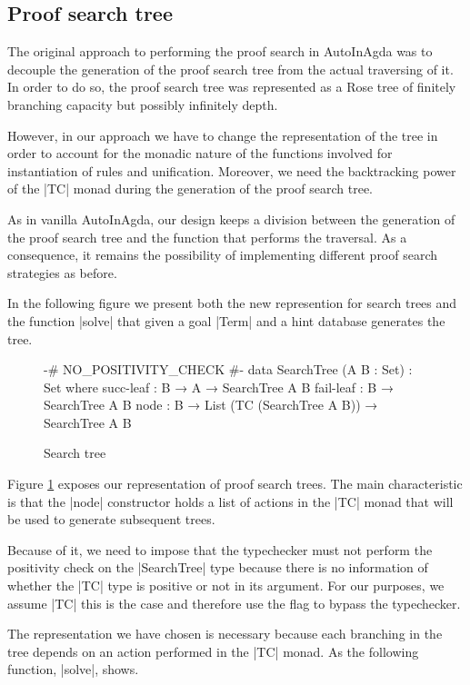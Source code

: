\documentclass[a4paper]{article}
\begin{document}
\subsection{Proof search tree}

The original approach to performing the proof search in AutoInAgda was to
decouple the generation of the proof search tree from the actual traversing of
it. In order to do so, the proof search tree was represented as a Rose tree of
finitely branching capacity but possibly infinitely depth.

However, in our approach we have to change the representation of the tree in order
to account for the monadic nature of the functions involved for instantiation of
rules and unification. Moreover, we need the backtracking power of the |TC| monad
during the generation of the proof search tree.

As in vanilla AutoInAgda, our design keeps a division between the generation of
the proof search tree and the function that performs the traversal. As a
consequence, it remains the possibility of implementing different proof search
strategies as before.



In the following figure we present both the new represention for search trees
and the function |solve| that given a goal |Term| and a hint database generates
the tree.

\begin{figure}[h]
\small
\begin{code}
  {-# NO\_POSITIVITY\_CHECK #-}
  data SearchTree (A B : Set) : Set where
    succ-leaf : B → A → SearchTree A B
    fail-leaf : B → SearchTree A B
    node      : B → List (TC (SearchTree A B)) → SearchTree A B
\end{code}
  \label{fig:tree}
  \caption{Search tree}
\end{figure}

Figure \ref{fig:tree} exposes our representation of proof search trees. The main
characteristic is that the |node| constructor holds a list of actions in the
|TC| monad that will be used to generate subsequent trees.

Because of it, we need to impose that the typechecker must not perform the
positivity check on the |SearchTree| type because there is no information of
whether the |TC| type is positive or not in its argument. For our purposes, we
assume |TC| this is the case and therefore use the flag to bypass the
typechecker.

The representation we have chosen is necessary because each branching in the
tree depends on an action performed in the |TC| monad. As the following
function, |solve|, shows.
\end{document}
